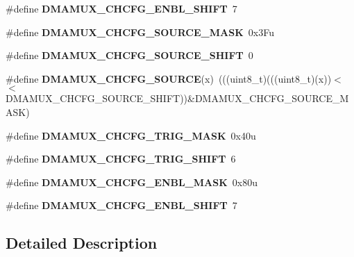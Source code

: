 \begin{DoxyCompactItemize}
\item 
\#define {\bfseries D\+M\+A\+M\+U\+X\+\_\+\+C\+H\+C\+F\+G\+\_\+\+E\+N\+B\+L\+\_\+\+S\+H\+I\+FT}~7\hypertarget{group__DMAMUX__Register__Masks_ga23d6f41370761b5c68e4d49f419aaee9}{}\label{group__DMAMUX__Register__Masks_ga23d6f41370761b5c68e4d49f419aaee9}

\item 
\#define {\bfseries D\+M\+A\+M\+U\+X\+\_\+\+C\+H\+C\+F\+G\+\_\+\+S\+O\+U\+R\+C\+E\+\_\+\+M\+A\+SK}~0x3\+Fu\hypertarget{group__DMAMUX__Register__Masks_ga35b279ba0b1c9e817901494cdac305c5}{}\label{group__DMAMUX__Register__Masks_ga35b279ba0b1c9e817901494cdac305c5}

\item 
\#define {\bfseries D\+M\+A\+M\+U\+X\+\_\+\+C\+H\+C\+F\+G\+\_\+\+S\+O\+U\+R\+C\+E\+\_\+\+S\+H\+I\+FT}~0\hypertarget{group__DMAMUX__Register__Masks_gac2b7553c4599d8e919750598dd03f8a3}{}\label{group__DMAMUX__Register__Masks_gac2b7553c4599d8e919750598dd03f8a3}

\item 
\#define {\bfseries D\+M\+A\+M\+U\+X\+\_\+\+C\+H\+C\+F\+G\+\_\+\+S\+O\+U\+R\+CE}(x)~(((uint8\+\_\+t)(((uint8\+\_\+t)(x))$<$$<$D\+M\+A\+M\+U\+X\+\_\+\+C\+H\+C\+F\+G\+\_\+\+S\+O\+U\+R\+C\+E\+\_\+\+S\+H\+I\+FT))\&D\+M\+A\+M\+U\+X\+\_\+\+C\+H\+C\+F\+G\+\_\+\+S\+O\+U\+R\+C\+E\+\_\+\+M\+A\+SK)\hypertarget{group__DMAMUX__Register__Masks_ga26ed125b670223f11ea326335729bb9b}{}\label{group__DMAMUX__Register__Masks_ga26ed125b670223f11ea326335729bb9b}

\item 
\#define {\bfseries D\+M\+A\+M\+U\+X\+\_\+\+C\+H\+C\+F\+G\+\_\+\+T\+R\+I\+G\+\_\+\+M\+A\+SK}~0x40u\hypertarget{group__DMAMUX__Register__Masks_gafd2b6158f86bedffb640e73c40cdd0f5}{}\label{group__DMAMUX__Register__Masks_gafd2b6158f86bedffb640e73c40cdd0f5}

\item 
\#define {\bfseries D\+M\+A\+M\+U\+X\+\_\+\+C\+H\+C\+F\+G\+\_\+\+T\+R\+I\+G\+\_\+\+S\+H\+I\+FT}~6\hypertarget{group__DMAMUX__Register__Masks_ga714a6b142fde49d701e3f624bb2417e1}{}\label{group__DMAMUX__Register__Masks_ga714a6b142fde49d701e3f624bb2417e1}

\item 
\#define {\bfseries D\+M\+A\+M\+U\+X\+\_\+\+C\+H\+C\+F\+G\+\_\+\+E\+N\+B\+L\+\_\+\+M\+A\+SK}~0x80u\hypertarget{group__DMAMUX__Register__Masks_ga311ccb0a9a00f29da44f8c41b33ba79f}{}\label{group__DMAMUX__Register__Masks_ga311ccb0a9a00f29da44f8c41b33ba79f}

\item 
\#define {\bfseries D\+M\+A\+M\+U\+X\+\_\+\+C\+H\+C\+F\+G\+\_\+\+E\+N\+B\+L\+\_\+\+S\+H\+I\+FT}~7\hypertarget{group__DMAMUX__Register__Masks_ga23d6f41370761b5c68e4d49f419aaee9}{}\label{group__DMAMUX__Register__Masks_ga23d6f41370761b5c68e4d49f419aaee9}

\end{DoxyCompactItemize}


\subsection{Detailed Description}
